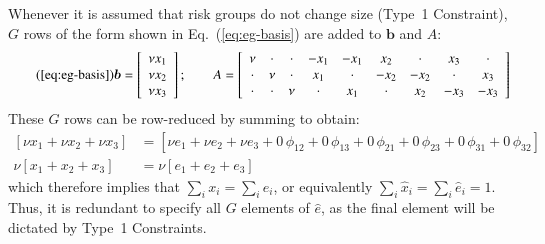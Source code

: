 Whenever it is assumed that risk groups do not change size
(Type~1 Constraint),
$G$ rows of the form shown in Eq.~(\ref{eq:eg-basis})
are added to $\bm{b}$ and $A$:
\begin{equation}\tag{\ref{eq:eg-basis}}
\bm{b} = \left[\begin{array}{c}
\nu x_1 \\ \nu x_2 \\ \nu x_3
\end{array}\right];\qquad
A = \left[\begin{array}{ccccccccc}
 \nu  & \cdot & \cdot & -x_1  & -x_1  &  x_2  & \cdot &  x_3  & \cdot \\
\cdot &  \nu  & \cdot &  x_1  & \cdot & -x_2  & -x_2  & \cdot &  x_3  \\
\cdot & \cdot &  \nu  & \cdot &  x_1  & \cdot &  x_2  & -x_3  & -x_3  \\
\end{array}\right]
\end{equation}
These $G$ rows can be row-reduced by summing to obtain:
\begin{equation}
\begin{aligned}
\left[ \nu x_1 + \nu x_2 + \nu x_3 \right] &= 
\left[ \nu e_1 + \nu e_2 + \nu e_3
+ 0\,\phi_{12} + 0\,\phi_{13} + 0\,\phi_{21} + 0\,\phi_{23} + 0\,\phi_{31} + 0\,\phi_{32}
\right]\\
\nu \left[ x_1 + x_2 + x_3 \right] &= 
\nu \left[ e_1 + e_2 + e_3 \right]
\end{aligned}
\end{equation}
which therefore implies that $\sum_{i} x_i = \sum_{i} e_i$,
or equivalently $\sum_{i} \hat{x}_i = \sum_{i} \hat{e}_i = 1$.
Thus, it is redundant to specify all $G$ elements of $\hat{e}$,
as the final element will be dictated by Type~1 Constraints.